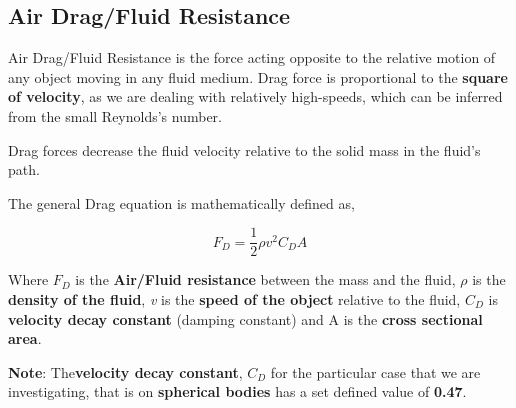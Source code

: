         
        
        
\subsection{{Air Drag/Fluid Resistance}}
        
    {Air Drag/Fluid Resistance is the force acting opposite to the relative motion of any object moving in any fluid medium. Drag force is proportional to the \textbf{square of velocity}, as we are dealing with relatively high-speeds, which can be inferred from the small Reynolds's number.}
            
    {Drag forces decrease the fluid velocity relative to the solid mass in the fluid's path.}
            
            
    {The general Drag equation is mathematically defined as,}
            
        $$F_D = \frac{1}{2}\rho v^2C_DA$$
           
    {Where $F_D$ is the \textbf{Air/Fluid resistance} between the mass and the fluid, $\rho$ is the \textbf{density of the fluid}, \textit{v} is the \textbf{speed of the object} relative to the fluid, $C_D$ is \textbf{velocity decay constant} (damping constant) and A is the \textbf{cross sectional area}.}
            
    {\textbf{Note}: The\textbf{velocity decay constant}, $C_D$ for the particular case that we are investigating, that is on \textbf{spherical bodies} has a set defined value of \textbf{0.47}.}
            
            
